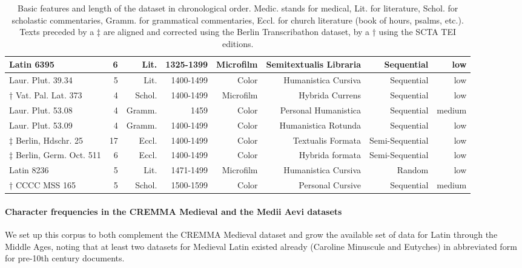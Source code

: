 \documentclass{article}
\begin{document}
\begin{table}[H]
{\begin{tabular}{|l|rrrrrrr|}
Latin 6395                   & 6    & Lit.  & 1325-1399 & Microfilm & Semitextualis Libraria      & Sequential      & low                     \\ \hline
Laur. Plut. 39.34            & 5    & Lit.  & 1400-1499 & Color     & Humanistica Cursiva         & Sequential      & low                     \\ 
† Vat. Pal. Lat. 373         & 4    & Schol. & 1400-1499 & Microfilm & Hybrida Currens             & Sequential      & low                     \\ 
Laur. Plut. 53.08            & 4    & Gramm. & 1459      & Color     & Personal Humanistica        & Sequential      & medium                  \\ 
Laur. Plut. 53.09            & 4    & Gramm. & 1400-1499 & Color     & Humanistica Rotunda         & Sequential      & low                     \\ 
‡ Berlin, Hdschr. 25         & 17   & Eccl.  & 1400-1499 & Color     & Textualis Formata           & Semi-Sequential & low                     \\
‡ Berlin, Germ. Oct. 511     & 6    & Eccl.  & 1400-1499 & Color     & Hybrida formata             & Semi-Sequential & low                     \\
Latin 8236                   & 5    & Lit.  & 1471-1499 & Microfilm & Humanistica Cursiva         & Random          & low                     \\ \hline
† CCCC MSS 165               & 5    & Schol. & 1500-1599 & Color     & Personal Cursive            & Sequential      & medium                  \\ \hline
\end{tabular}%
}
\caption{Basic features and length of the dataset in chronological order. Medic. stands for medical, Lit. for literature, Schol. for scholastic commentaries, Gramm. for grammatical commentaries, Eccl. for church literature (book of hours, psalms, etc.). Texts preceded by a ‡ are aligned and corrected using the Berlin Transcribathon dataset, by a † using the SCTA TEI editions.}
\label{tab:dataset}
\end{table}

\paragraph{Character frequencies in the CREMMA Medieval and the Medii Aevi datasets} We set up this corpus to both complement the CREMMA Medieval dataset and grow the available set of data for Latin through the Middle Ages, noting that at least two datasets for Medieval Latin existed already (Caroline Minuscule and Eutyches) in abbreviated form for pre-10th century documents.
\end{document}
